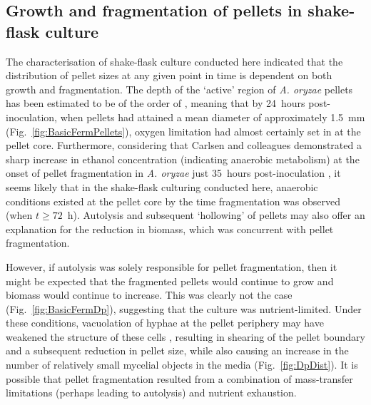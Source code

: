 \subsection{Growth and fragmentation of pellets in shake-flask culture}

The characterisation of shake-flask culture conducted here indicated that the distribution of pellet sizes at any given point in time is dependent on both growth and fragmentation. The depth of the \lq active' region of \emph{A. oryzae} pellets has been estimated to be of the order of  \cite{carlsen1996a}, meaning that by 24~hours post-inoculation, when pellets had attained a mean diameter of approximately 1.5~mm (Fig.~\ref{fig:BasicFermPellets}), oxygen limitation had almost certainly set in at the pellet core. Furthermore, considering that Carlsen and colleagues demonstrated a sharp increase in ethanol concentration (indicating anaerobic metabolism) at the onset of pellet fragmentation in \emph{A. oryzae} just 35~hours post-inoculation \cite{carlsen1996a}, it seems likely that in the shake-flask culturing conducted here, anaerobic conditions existed at the pellet core by the time fragmentation was observed (when $t \geq 72$~h). Autolysis and subsequent \lq hollowing' of pellets may also offer an explanation for the reduction in biomass, which was concurrent with pellet fragmentation.

However, if autolysis was solely responsible for pellet fragmentation, then it might be expected that the fragmented pellets would continue to grow and biomass would continue to increase. This was clearly not the case (Fig.~\ref{fig:BasicFermDp}), suggesting that the culture was nutrient-limited. Under these conditions, vacuolation of hyphae at the pellet periphery may have weakened the structure of these cells \cite{papagianni1999}, resulting in shearing of the pellet boundary and a subsequent reduction in pellet size, while also causing an increase in the number of relatively small mycelial objects in the media (Fig.~\ref{fig:DpDist}). It is possible that pellet fragmentation resulted from a combination of mass-transfer limitations (perhaps leading to autolysis) and nutrient exhaustion.

